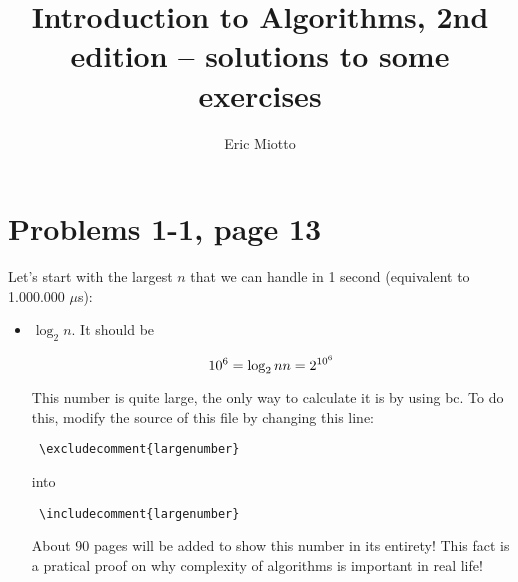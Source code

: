 




\author{Eric Miotto}
\title{Introduction to Algorithms, 2nd edition -- solutions to some exercises}


\maketitle
\tableofcontents
\newpage

\section{Problems 1-1, page 13}

Let's start with the largest $n$ that we can handle in 1 second (equivalent to 1.000.000 $\mu$s):

\begin{itemize}
 \item $\log_2 n$. It should be
 
\begin{equation}
 10^6=\log_2 n \\
 n=2^{10^6}
\end{equation}

This number is quite large, the only way to calculate it is by using bc. To do this, modify the source of this file by changing this line:

\begin{verbatim}
 \excludecomment{largenumber}
\end{verbatim}

into

\begin{verbatim}
 \includecomment{largenumber}
\end{verbatim}

About 90 pages will be added to show this number in its entirety! This fact is a pratical proof on why complexity of algorithms is important in real life!

\end{itemize}

